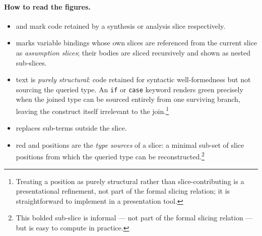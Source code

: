 \paragraph{How to read the figures.}
\begin{itemize}\setlength\itemsep{1pt}
  \item {} and  mark code retained by a synthesis or analysis slice respectively.
  \item {} marks variable bindings whose own slices are referenced from the current slice as \emph{assumption slices}; their bodies are sliced recursively and shown as nested sub-slices.
  \item {} text is \emph{purely structural}: code retained for syntactic well-formedness but not sourcing the queried type. An \texttt{if} or \texttt{case} keyword renders green precisely when the joined type can be sourced entirely from one surviving branch, leaving the construct itself irrelevant to the join.\footnote{Treating a position as purely structural rather than slice-contributing is a presentational refinement, not part of the formal slicing relation; it is straightforward to implement in a presentation tool.}
  \item \protect\fold{} replaces sub-terms outside the slice.
  \item {} red and  positions are the \emph{type sources} of a slice: a minimal sub-set of slice positions from which the queried type can be reconstructed.\footnote{This bolded sub-slice is informal --- not part of the formal slicing relation --- but is easy to compute in practice.}
\end{itemize}


